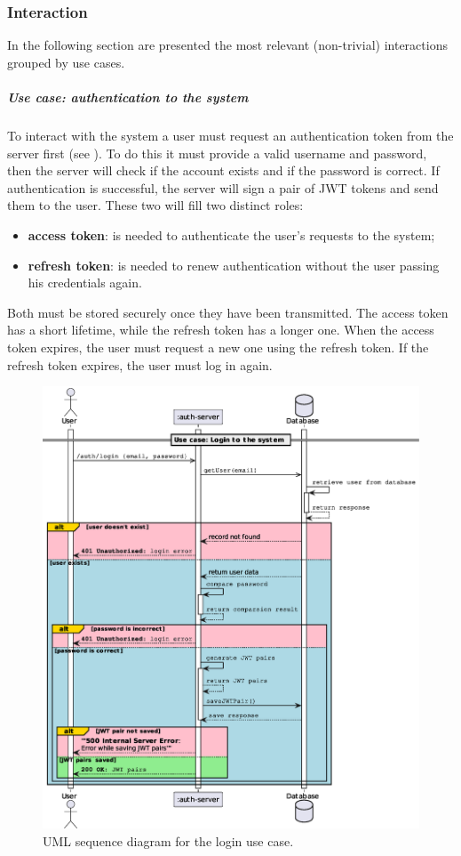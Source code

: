 \documentclass{scrartcl}
\begin{document}
\subsubsection{Interaction}

In the following section are presented the most relevant (non-trivial) interactions grouped by use cases.

\subparagraph*{Use case: authentication to the system}
\label{uc:auth-to-the-system} 
To interact with the system a user must request an authentication token from the server first (see ). To do this it must provide a valid username and password, then the server will check if the account exists and if the password is correct.
If authentication is successful, the server will sign a pair of JWT tokens and send them to the user. These two will fill two distinct roles:
\begin{itemize}
    \item \textbf{access token}: is needed to authenticate the user's requests to the system;
    \item \textbf{refresh token}: is needed to renew authentication without the user passing his credentials again.
\end{itemize}
Both must be stored securely once they have been transmitted. The access token has a short lifetime, while the refresh token has a longer one. When the access token expires, the user must request a new one using the refresh token. If the refresh token expires, the user must log in again.

\begin{figure}
    \centering
    \includegraphics[width=\linewidth]{figures/login-to-the-system.eps}
    \caption{UML sequence diagram for the login use case.}
    \label{fig:login-to-the-system} 
\end{figure}
\end{document}
